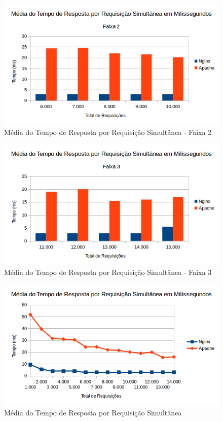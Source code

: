 \begin{figure}[H]
	\centering
	\includegraphics[width=1\linewidth]{graficos/grafico5-f2} 
	\caption{Média do Tempo de Resposta por Requisição Simultânea - Faixa 2}
	\label{fig:grafico5-f2}
\end{figure}

\begin{figure}[H]
	\centering
	\includegraphics[width=1\linewidth]{graficos/grafico5-f3} 
	\caption{Média do Tempo de Resposta por Requisição Simultânea - Faixa 3}
	\label{fig:grafico5-f3}
\end{figure}

\begin{figure}[H]
	\centering
	\includegraphics[width=1\linewidth]{graficos/grafico5} 
	\caption{Média do Tempo de Resposta por Requisição Simultânea}
	\label{fig:grafico5}
\end{figure}






